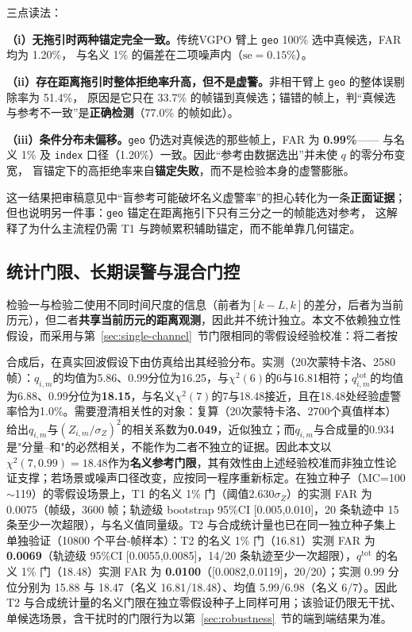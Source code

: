 \documentclass[UTF8,a4paper,zihao=-4]{ctexart}
\begin{document}
三点读法：

\textbf{（i）无拖引时两种锚定完全一致。}传统VGPO 臂上 \texttt{geo} 100\% 选中真候选，FAR 均为 1.20\%，
与名义 1\% 的偏差在二项噪声内（$\mathrm{se}=0.15\%$）。

\textbf{（ii）存在距离拖引时整体拒绝率升高，但不是虚警。}非相干臂上 \texttt{geo} 的整体误剔除率为 51.4\%，
原因是它只在 33.7\% 的帧锚到真候选；锚错的帧上，判“真候选与参考不一致”是\textbf{正确检测}（77.0\% 的帧如此）。

\textbf{（iii）条件分布未偏移。}\texttt{geo} 仍选对真候选的那些帧上，FAR 为 \textbf{0.99\%}——
与名义 1\% 及 \texttt{index} 口径（1.20\%）一致。因此“参考由数据选出”并未使 $q$ 的零分布变宽，
盲锚定下的高拒绝率来自\textbf{锚定失败}，而不是检验本身的虚警膨胀。

这一结果把审稿意见中“盲参考可能破坏名义虚警率”的担心转化为一条\textbf{正面证据}；
但也说明另一件事：\texttt{geo} 锚定在距离拖引下只有三分之一的帧能选对参考，
这解释了为什么主流程仍需 T1 与跨帧累积辅助锚定，而不能单靠几何锚定。

\subsection{统计门限、长期误警与混合门控}\label{sup:gate}
检验一与检验二使用不同时间尺度的信息（前者为\([k-L,k]\)的差分，后者为当前历元），但二者\textbf{共享当前历元的距离观测}，因此并不统计独立。本文不依赖独立性假设，而采用与第~\ref{sec:single-channel}~节门限相同的零假设经验校准：将二者按

合成后，在真实回波假设下由仿真给出其经验分布。实测（20次蒙特卡洛、2580帧）：\(q_{i,m}\)的均值为5.86、0.99分位为16.25，与\(\chi^2(6)\)的6与16.81相符；\(q^{\mathrm{tot}}_{i,m}\)的均值为6.88、0.99分位为\textbf{18.15}，与名义\(\chi^2(7)\)的7与18.48接近，且在18.48处经验虚警率恰为1.0\%。需要澄清相关性的对象：复算（20次蒙特卡洛、2700个真值样本）给出\(q_{i,m}\)与\((Z_{i,m}/\sigma_Z)^2\)的相关系数为\textbf{0.049}，近似独立；而\(q_{i,m}\)与合成量的0.934是"分量--和"的必然相关，不能作为二者不独立的证据。因此本文以\(\chi^2(7,0.99)=18.48\)作为\textbf{名义参考门限}，其有效性由上述经验校准而非独立性论证支撑；若场景或噪声口径改变，应按同一程序重新标定。在独立种子（MC=100$\sim$119）的零假设场景上，T1 的名义 1\% 门（阈值$2.630\sigma_Z$）的实测 FAR 为 0.0075（帧级，3600 帧；轨迹级 bootstrap 95\%CI [0.005,0.010]，20 条轨迹中 15 条至少一次超限），与名义值同量级。T2 与合成统计量也已在同一独立种子集上单独验证（10800 个平台-帧样本）：T2 的名义 1\% 门（16.81）实测 FAR 为 \textbf{0.0069}（轨迹级 95\%CI [0.0055,0.0085]，14/20 条轨迹至少一次超限），\(q^{\mathrm{tot}}\) 的名义 1\% 门（18.48）实测 FAR 为 \textbf{0.0100}（[0.0082,0.0119]，20/20）；实测 0.99 分位分别为 15.88 与 18.47（名义 16.81/18.48）、均值 5.99/6.98（名义 6/7）。因此 T2 与合成统计量的名义门限在独立零假设种子上同样可用；该验证仍限无干扰、单候选场景，含干扰时的门限行为以第~\ref{sec:robustness}~节的端到端结果为准。
\end{document}

